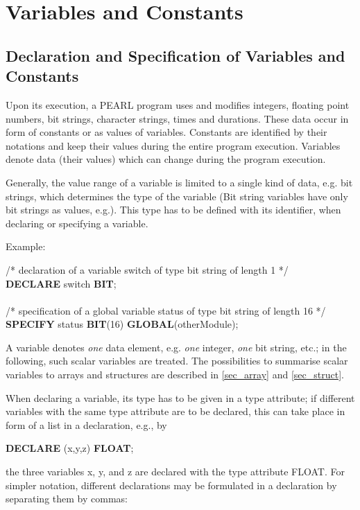 \chapter{Variables and Constants}  %

\section{Declaration and Specification of Variables and Constants}  %

Upon its execution, a PEARL program uses and modifies integers, floating
point numbers, bit strings, character strings, times and durations.
These data occur in form of constants or as values of variables.
Constants are identified by their notations and keep their values during
the entire program execution. Variables denote data (their values) which
can change during the program execution.

Generally, the value range of a variable is limited to a single kind of data,
e.g. bit strings, which determines the type of the variable (Bit string
variables have only bit strings as values, e.g.). This type has to be
defined with its identifier, when declaring or specifying a
variable.

Example:

/* declaration of a variable switch of type bit string of length 1 */ \\
{\bf DECLARE} switch {\bf BIT}; \\
\\
/* specification of a global variable status of type bit string 
of length 16 */ \\
{\bf SPECIFY} status {\bf BIT}(16) {\bf GLOBAL}(otherModule);

A variable denotes {\it one} data element, e.g. {\it one} integer, {\it
one} bit string, etc.; in the following, such scalar variables are
treated. The possibilities to summarise scalar variables to arrays and
structures are described in \ref{sec_array} and \ref{sec_struct}.

When declaring a variable, its type has to be given in a type attribute;
if different variables with the same type attribute are to be declared,
this can take place in form of a list in a declaration, e.g., by

{\bf DECLARE} (x,y,z) {\bf FLOAT};

the three variables x, y, and z are declared with the type attribute
FLOAT.  For simpler notation, different declarations may be formulated
in a declaration by separating them by commas:


